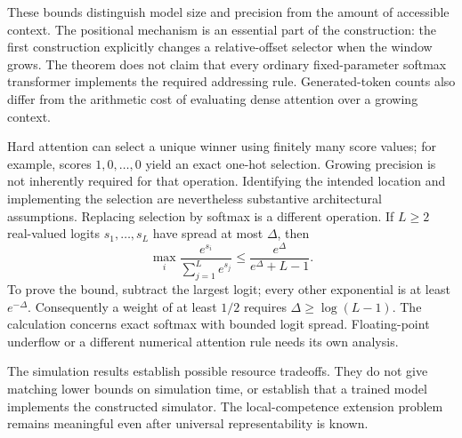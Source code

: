 \documentclass[11pt,twoside]{article}
\theoremstyle{definition}
\theoremstyle{remark}
\begin{document}
These bounds distinguish model size and precision from the amount of
accessible context. The positional mechanism is an essential part of the
construction: the first construction explicitly changes a relative-offset
selector when the window grows. The theorem does not claim that every
ordinary fixed-parameter softmax transformer implements the required
addressing rule. Generated-token counts also differ from the arithmetic
cost of evaluating dense attention over a growing context.

Hard attention can select a unique winner using finitely many score values;
for example, scores $1,0,\ldots,0$ yield an exact one-hot selection. Growing
precision is not inherently required for that operation. Identifying the
intended location and implementing the selection are nevertheless substantive
architectural assumptions. Replacing selection by softmax is a different
operation. If $L\geq2$ real-valued logits $s_1,\ldots,s_L$ have spread at most
$\Delta$, then
\begin{equation}
 \max_i\frac{e^{s_i}}{\sum_{j=1}^L e^{s_j}}
 \leq\frac{e^\Delta}{e^\Delta+L-1}.
 \label{eq:attention-spread}
\end{equation}
To prove the bound, subtract the largest logit; every other exponential is
at least $e^{-\Delta}$. Consequently a weight of at least $1/2$ requires
$\Delta\geq\log(L-1)$. The calculation concerns exact softmax with bounded
logit spread. Floating-point underflow or a different numerical attention
rule needs its own analysis.

The simulation results establish possible resource tradeoffs. They do not
give matching lower bounds on simulation time, or establish that a trained
model implements the constructed simulator. The local-competence extension
problem remains meaningful even after universal representability is known.
\end{document}
